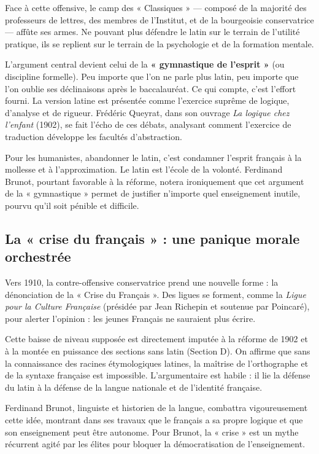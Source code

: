 Face à cette offensive, le camp des « Classiques » — composé de la majorité des professeurs de
lettres, des membres de l'Institut, et de la bourgeoisie conservatrice — affûte ses armes. Ne
pouvant plus défendre le latin sur le terrain de l'utilité pratique, ils se replient sur le terrain
de la psychologie et de la formation mentale.

L'argument central devient celui de la \textbf{« gymnastique de l'esprit »} (ou discipline
formelle). Peu importe que l'on ne parle plus latin, peu importe que l'on oublie ses déclinaisons
après le baccalauréat. Ce qui compte, c'est l'effort fourni. La version latine est présentée comme
l'exercice suprême de logique, d'analyse et de rigueur. Frédéric Queyrat, dans son ouvrage
\textit{La logique chez l'enfant} (1902), se fait l'écho de ces débats, analysant comment l'exercice
de traduction développe les facultés d'abstraction.\cite{I-2-1-ref12}

Pour les humanistes, abandonner le latin, c'est condamner l'esprit français à la mollesse et à
l'approximation. Le latin est l'école de la volonté. Ferdinand Brunot, pourtant favorable à la
réforme, notera ironiquement que cet argument de la « gymnastique » permet de justifier n'importe
quel enseignement inutile, pourvu qu'il soit pénible et difficile.\cite{I-2-1-ref14}



\subsection{La « crise du français » : une panique morale orchestrée}

Vers 1910, la contre-offensive conservatrice prend une nouvelle forme : la dénonciation de la «
Crise du Français ». Des ligues se forment, comme la \textit{Ligue pour la Culture Française}
(présidée par Jean Richepin et soutenue par Poincaré), pour alerter l'opinion : les jeunes Français
ne sauraient plus écrire.\cite{I-2-1-ref15}

Cette baisse de niveau supposée est directement imputée à la réforme de 1902 et à la montée en
puissance des sections sans latin (Section D). On affirme que sans la connaissance des racines
étymologiques latines, la maîtrise de l'orthographe et de la syntaxe française est impossible.
L'argumentaire est habile : il lie la défense du latin à la défense de la langue nationale et de
l'identité française.\cite{I-2-1-ref15}

Ferdinand Brunot, linguiste et historien de la langue, combattra vigoureusement cette idée, montrant
dans ses travaux que le français a sa propre logique et que son enseignement peut être
autonome.\cite{I-2-1-ref17} Pour Brunot, la « crise » est un mythe récurrent agité par les élites
pour bloquer la démocratisation de l'enseignement.



